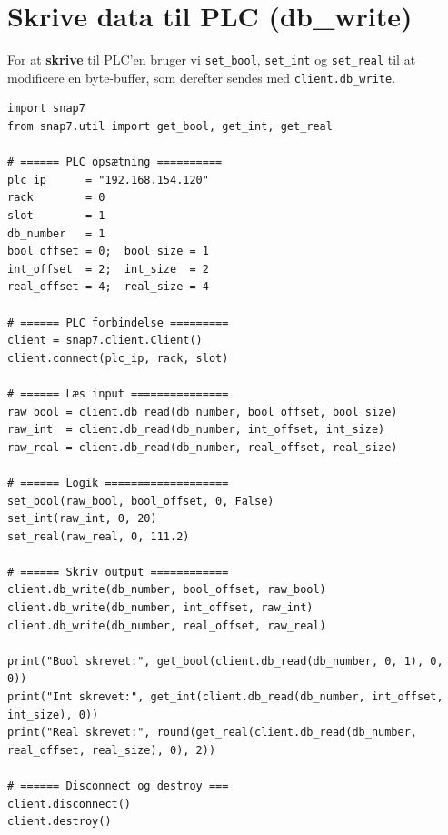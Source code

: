 \documentclass[12pt, a4paper]{article}
\begin{document}
\clearpage
\section{Skrive data til PLC (db\_write)}

For at \textbf{skrive} til PLC'en bruger vi \texttt{set\_bool}, \texttt{set\_int}
og \texttt{set\_real} til at modificere en byte-buffer, som derefter sendes med
\texttt{client.db\_write}.

\begin{tcolorbox}[pythonbox, title={\faPython\quad Kode 3 — Skrive Bool, Int og Real til DB1}]
\begin{verbatim}
import snap7
from snap7.util import get_bool, get_int, get_real

# ====== PLC opsætning ==========
plc_ip      = "192.168.154.120"
rack        = 0
slot        = 1
db_number   = 1
bool_offset = 0;  bool_size = 1
int_offset  = 2;  int_size  = 2
real_offset = 4;  real_size = 4

# ====== PLC forbindelse =========
client = snap7.client.Client()
client.connect(plc_ip, rack, slot)

# ====== Læs input ===============
raw_bool = client.db_read(db_number, bool_offset, bool_size)
raw_int  = client.db_read(db_number, int_offset, int_size)
raw_real = client.db_read(db_number, real_offset, real_size)

# ====== Logik ===================
set_bool(raw_bool, bool_offset, 0, False)
set_int(raw_int, 0, 20)
set_real(raw_real, 0, 111.2)

# ====== Skriv output ============
client.db_write(db_number, bool_offset, raw_bool)
client.db_write(db_number, int_offset, raw_int)
client.db_write(db_number, real_offset, raw_real)

print("Bool skrevet:", get_bool(client.db_read(db_number, 0, 1), 0, 0))
print("Int skrevet:", get_int(client.db_read(db_number, int_offset, int_size), 0))
print("Real skrevet:", round(get_real(client.db_read(db_number, real_offset, real_size), 0), 2))

# ====== Disconnect og destroy ===
client.disconnect()
client.destroy()
\end{verbatim}
\end{tcolorbox}

\clearpage
\end{document}
